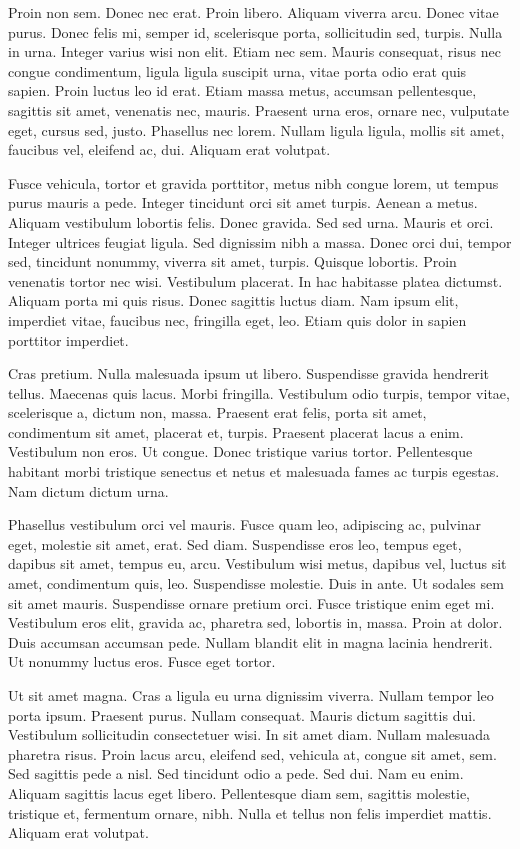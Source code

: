 \documentclass{article}
\begin{document}
Proin non sem. Donec nec erat. Proin libero. Aliquam viverra arcu. Donec
vitae purus. Donec felis mi, semper id, scelerisque porta, sollicitudin sed,
turpis.
Nulla in urna. Integer varius wisi non elit. Etiam nec sem. Mauris consequat,
risus nec congue condimentum, ligula ligula suscipit urna, vitae porta odio
erat quis sapien. Proin luctus leo id erat. Etiam massa metus, accumsan
pellentesque, sagittis sit amet, venenatis nec, mauris. Praesent urna eros,
ornare nec, vulputate eget, cursus sed, justo. Phasellus nec lorem. Nullam
ligula ligula, mollis sit amet, faucibus vel, eleifend ac, dui. Aliquam erat
volutpat.

Fusce vehicula, tortor et gravida porttitor, metus nibh congue lorem, ut
tempus purus mauris a pede. Integer tincidunt orci sit amet turpis. Aenean a
metus. Aliquam vestibulum lobortis felis. Donec gravida. Sed sed urna. Mauris
et orci. Integer ultrices feugiat ligula. Sed dignissim nibh a massa. Donec
orci dui, tempor sed, tincidunt nonummy, viverra sit amet, turpis. Quisque
lobortis. Proin venenatis tortor nec wisi. Vestibulum placerat. In hac
habitasse platea dictumst. Aliquam porta mi quis risus. Donec sagittis luctus
diam. Nam ipsum elit, imperdiet vitae, faucibus nec, fringilla eget, leo. Etiam
quis dolor in sapien porttitor imperdiet.

Cras pretium. Nulla malesuada ipsum ut libero. Suspendisse gravida hendrerit
tellus. Maecenas quis lacus. Morbi fringilla. Vestibulum odio turpis, tempor
vitae, scelerisque a, dictum non, massa. Praesent erat felis, porta sit amet,
condimentum sit amet, placerat et, turpis. Praesent placerat lacus a enim.
Vestibulum non eros. Ut congue. Donec tristique varius tortor. Pellentesque
habitant morbi tristique senectus et netus et malesuada fames ac turpis
egestas. Nam dictum dictum urna.

Phasellus vestibulum orci vel mauris. Fusce quam leo, adipiscing ac,
pulvinar eget, molestie sit amet, erat. Sed diam. Suspendisse eros leo, tempus
eget, dapibus sit amet, tempus eu, arcu. Vestibulum wisi metus, dapibus vel,
luctus sit amet, condimentum quis, leo. Suspendisse molestie. Duis in ante. Ut
sodales sem sit amet mauris. Suspendisse ornare pretium orci. Fusce tristique
enim eget mi. Vestibulum eros elit, gravida ac, pharetra sed, lobortis in,
massa. Proin at dolor. Duis accumsan accumsan pede. Nullam blandit elit in
magna lacinia hendrerit. Ut nonummy luctus eros. Fusce eget tortor.

Ut sit amet magna. Cras a ligula eu urna dignissim viverra. Nullam tempor leo
porta ipsum. Praesent purus. Nullam consequat. Mauris dictum sagittis dui.
Vestibulum sollicitudin consectetuer wisi. In sit amet diam. Nullam malesuada
pharetra risus. Proin lacus arcu, eleifend sed, vehicula at, congue sit amet,
sem. Sed sagittis pede a nisl. Sed tincidunt odio a pede. Sed dui. Nam eu enim.
Aliquam sagittis lacus eget libero. Pellentesque diam sem, sagittis molestie,
tristique et, fermentum ornare, nibh. Nulla et tellus non felis imperdiet
mattis. Aliquam erat volutpat.
\end{document}

